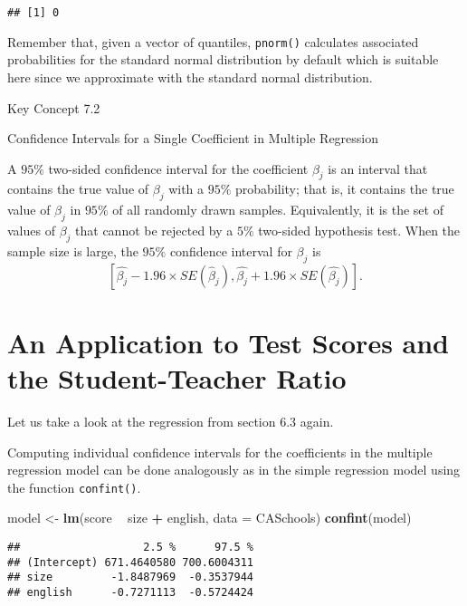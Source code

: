 \documentclass[]{book}
\newenvironment{Shaded}{\begin{snugshade}}{\end{snugshade}}
\newcommand{\KeywordTok}[1]{\textcolor[rgb]{0.13,0.29,0.53}{\textbf{#1}}}
\newcommand{\DataTypeTok}[1]{\textcolor[rgb]{0.13,0.29,0.53}{#1}}
\newcommand{\StringTok}[1]{\textcolor[rgb]{0.31,0.60,0.02}{#1}}
\newcommand{\OperatorTok}[1]{\textcolor[rgb]{0.81,0.36,0.00}{\textbf{#1}}}
\newcommand{\NormalTok}[1]{#1}
\theoremstyle{definition}
\theoremstyle{definition}
\theoremstyle{definition}
\theoremstyle{remark}
\begin{document}
\begin{verbatim}
## [1] 0
\end{verbatim}

Remember that, given a vector of quantiles, \texttt{pnorm()} calculates
associated probabilities for the standard normal distribution by default
which is suitable here since we approximate with the standard normal
distribution.

Key Concept 7.2

Confidence Intervals for a Single Coefficient in Multiple Regression

A \(95\%\) two-sided confidence interval for the coefficient \(\beta_j\)
is an interval that contains the true value of \(\beta_j\) with a
\(95 \%\) probability; that is, it contains the true value of
\(\beta_j\) in \(95 \%\) of all randomly drawn samples. Equivalently, it
is the set of values of \(\beta_j\) that cannot be rejected by a
\(5 \%\) two-sided hypothesis test. When the sample size is large, the
\(95 \%\) confidence interval for \(\beta_j\) is
\[\left[\hat{\beta_j}- 1.96 \times SE(\hat{\beta}_j), \hat{\beta_j} + 1.96 \times SE(\hat{\beta_j})\right].\]

\section{An Application to Test Scores and the Student-Teacher
Ratio}\label{an-application-to-test-scores-and-the-student-teacher-ratio}

Let us take a look at the regression from section 6.3 again.

Computing individual confidence intervals for the coefficients in the
multiple regression model can be done analogously as in the simple
regression model using the function \texttt{confint()}.

\begin{Shaded}
\begin{Highlighting}[]
\NormalTok{model <-}\StringTok{ }\KeywordTok{lm}\NormalTok{(score }\OperatorTok{~}\StringTok{ }\NormalTok{size }\OperatorTok{+}\StringTok{ }\NormalTok{english, }\DataTypeTok{data =}\NormalTok{ CASchools)}
\KeywordTok{confint}\NormalTok{(model)}
\end{Highlighting}
\end{Shaded}

\begin{verbatim}
##                   2.5 %      97.5 %
## (Intercept) 671.4640580 700.6004311
## size         -1.8487969  -0.3537944
## english      -0.7271113  -0.5724424
\end{verbatim}
\end{document}
